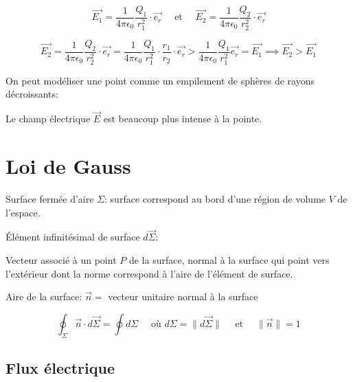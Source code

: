 \documentclass[
    11pt,
    a4paper,
    oneside,
    headinlcude, footinclude,
    twoside,
]{report}
\renewcommand{\vec}[1]{\overrightarrow{#1}}
\begin{document}
\begin{equation}
    \label{eq:7.16}
    \vec{E_{1}} = \frac{1}{4 \pi \epsilon_0} \frac{Q_1}{r_1^2} \cdot \vec{e_{r}}
    \quad \text{ et } \quad \vec{E_{2}} = \frac{1}{4 \pi \epsilon_0} \frac{Q_2}{r_2^2}
    \cdot \vec{e_{r}}
\end{equation}

$$\vec{E_{2}} = \frac{1}{4 \pi \epsilon_0} \frac{Q_2}{r_2^2} \cdot \vec{e_{r}}
= \frac{1}{4 \pi \epsilon_0} \frac{Q_1}{r_1^2} \cdot \frac{r_1}{r_2} \cdot \vec{e_{r}}
> \frac{1}{4 \pi \epsilon_0} \frac{Q_1}{r_1^2} \vec{e_{r}} = \vec{E_{1}}
\implies \vec{E_{2}} > \vec{E_{1}}$$

On peut modéliser une point comme un empilement de sphères de rayons
décroissants:

\begin{center}
\end{center}
Le champ électrique $\vec E$ est beaucoup plus intense à la pointe.

\section{Loi de Gauss}
\label{sec:loi_de_gauss}

Surface fermée d'aire $\Sigma$: surface correspond au bord d'une région de
volume $V$ de l'espace.

\begin{center}
\end{center}

Élément infinitésimal de surface $d\vec \Sigma$:

Vecteur associé à un point $P$ de la surface, normal à la surface qui point
vers l'extérieur dont la norme correspond à l'aire de l'élément de surface. 

Aire de la surface: $\vec n =$ vecteur unitaire normal à la surface

\begin{equation}
    \label{eq:7.17}
    \oint_{\Sigma} \vec n \cdot d \vec \Sigma = \oint d \Sigma \quad
    \text{ où } d\Sigma = \| d \vec \Sigma \|  \quad \text{ et } \quad \|\vec n\|
    = 1 
\end{equation}

\subsection{Flux électrique}
\label{sub:flux_electrique}
\end{document}
